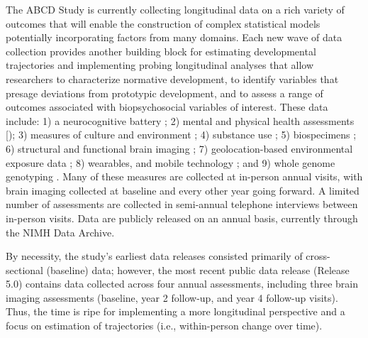 \documentclass[
  number,
  preprint,
  3p,
  twocolumn]{elsarticle}
\begin{document}
The ABCD Study is currently collecting longitudinal data on a rich
variety of outcomes that will enable the construction of complex
statistical models potentially incorporating factors from many domains.
Each new wave of data collection provides another building block for
estimating developmental trajectories and implementing probing
longitudinal analyses that allow researchers to characterize normative
development, to identify variables that presage deviations from
prototypic development, and to assess a range of outcomes associated
with biopsychosocial variables of interest. These data include: 1) a
neurocognitive battery \citep{luciana2018a, thompson2019}; 2) mental and
physical health assessments {[}\citep{barch2018}); 3) measures of
culture and environment \citep{gonzalez2021, zucker2018}; 4) substance
use \citep{lisdahl2021}; 5) biospecimens \citep{uban2018}; 6) structural
and functional brain imaging \citep{casey2018, hagler2019}; 7)
geolocation-based environmental exposure data \citep{fan2021}; 8)
wearables, and mobile technology \citep{bagot2018}; and 9) whole genome
genotyping \citep{loughnan2020}. Many of these measures are collected at
in-person annual visits, with brain imaging collected at baseline and
every other year going forward. A limited number of assessments are
collected in semi-annual telephone interviews between in-person visits.
Data are publicly released on an annual basis, currently through the
NIMH Data Archive.

By necessity, the study's earliest data releases consisted primarily of
cross-sectional (baseline) data; however, the most recent public data
release (Release 5.0) contains data collected across four annual
assessments, including three brain imaging assessments (baseline, year 2
follow-up, and year 4 follow-up visits). Thus, the time is ripe for
implementing a more longitudinal perspective and a focus on estimation
of trajectories (i.e., within-person change over time).

\hypertarget{section}{%
\subsection{}\label{section}}
\end{document}
